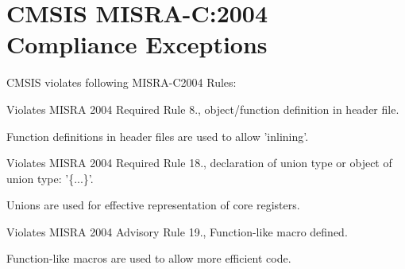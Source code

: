 \hypertarget{group___c_m_s_i_s___m_i_s_r_a___exceptions}{\section{C\-M\-S\-I\-S M\-I\-S\-R\-A-\/\-C\-:2004 Compliance Exceptions}
\label{group___c_m_s_i_s___m_i_s_r_a___exceptions}
}
C\-M\-S\-I\-S violates following M\-I\-S\-R\-A-\/\-C2004 Rules\-:
\begin{DoxyItemize}
\item Violates M\-I\-S\-R\-A 2004 Required Rule 8., object/function definition in header file.\par
 Function definitions in header files are used to allow 'inlining'.
\item Violates M\-I\-S\-R\-A 2004 Required Rule 18., declaration of union type or object of union type\-: '\{...\}'.\par
 Unions are used for effective representation of core registers.
\item Violates M\-I\-S\-R\-A 2004 Advisory Rule 19., Function-\/like macro defined.\par
 Function-\/like macros are used to allow more efficient code. 
\end{DoxyItemize}